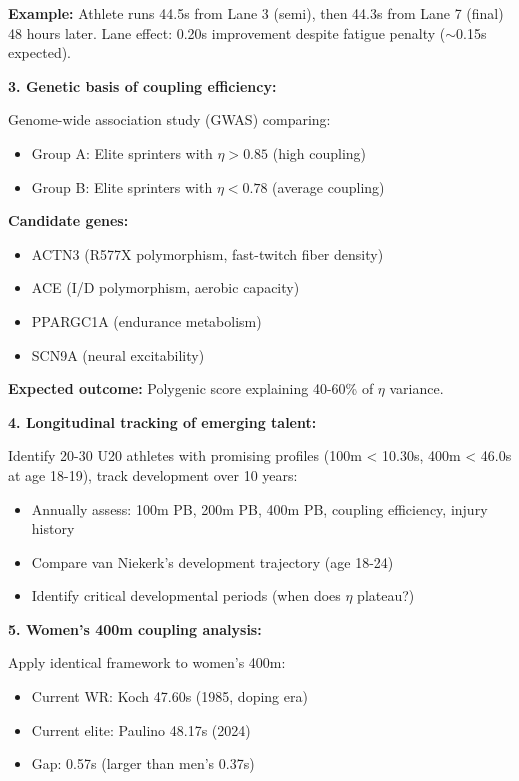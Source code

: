 \textbf{Example:} Athlete runs 44.5s from Lane 3 (semi), then 44.3s from Lane 7 (final) 48 hours later. Lane effect: 0.20s improvement despite fatigue penalty ($\sim$0.15s expected).

\textbf{3. Genetic basis of coupling efficiency:}

Genome-wide association study (GWAS) comparing:
\begin{itemize}
    \item Group A: Elite sprinters with $\eta > 0.85$ (high coupling)
    \item Group B: Elite sprinters with $\eta < 0.78$ (average coupling)
\end{itemize}

\textbf{Candidate genes:}
\begin{itemize}
    \item ACTN3 (R577X polymorphism, fast-twitch fiber density)
    \item ACE (I/D polymorphism, aerobic capacity)
    \item PPARGC1A (endurance metabolism)
    \item SCN9A (neural excitability)
\end{itemize}

\textbf{Expected outcome:} Polygenic score explaining 40-60\% of $\eta$ variance.

\textbf{4. Longitudinal tracking of emerging talent:}

Identify 20-30 U20 athletes with promising profiles (100m < 10.30s, 400m < 46.0s at age 18-19), track development over 10 years:
\begin{itemize}
    \item Annually assess: 100m PB, 200m PB, 400m PB, coupling efficiency, injury history
    \item Compare van Niekerk's development trajectory (age 18-24)
    \item Identify critical developmental periods (when does $\eta$ plateau?)
\end{itemize}

\textbf{5. Women's 400m coupling analysis:}

Apply identical framework to women's 400m:
\begin{itemize}
    \item Current WR: Koch 47.60s (1985, doping era)
    \item Current elite: Paulino 48.17s (2024)
    \item Gap: 0.57s (larger than men's 0.37s)
\end{itemize}


